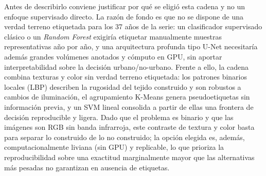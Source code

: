 Antes de describirlo conviene justificar por qué se eligió esta cadena y no un enfoque supervisado directo. La razón de fondo es que no se dispone de una verdad terreno etiquetada para los 37 años de la serie: un clasificador supervisado clásico o un \textit{Random Forest} exigiría etiquetar manualmente muestras representativas año por año, y una arquitectura profunda tipo U-Net necesitaría además grandes volúmenes anotados y cómputo en GPU, sin aportar interpretabilidad sobre la decisión urbano/no-urbano. Frente a ello, la cadena combina texturas y color sin verdad terreno etiquetada: los patrones binarios locales (LBP) describen la rugosidad del tejido construido y son robustos a cambios de iluminación, el agrupamiento K-Means genera pseudoetiquetas sin información previa, y un SVM lineal consolida a partir de ellas una frontera de decisión reproducible y ligera. Dado que el problema es binario y que las imágenes son RGB sin banda infrarroja, este contraste de textura y color basta para separar lo construido de lo no construido; la opción elegida es, además, computacionalmente liviana (sin GPU) y replicable, lo que prioriza la reproducibilidad sobre una exactitud marginalmente mayor que las alternativas más pesadas no garantizan en ausencia de etiquetas.

